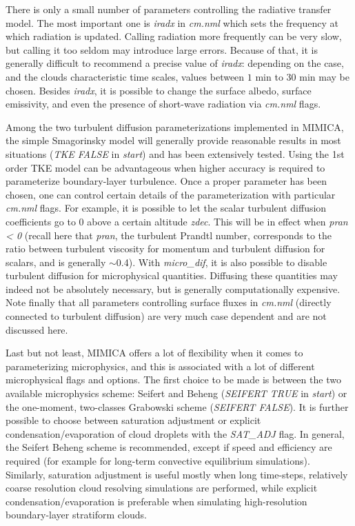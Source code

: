 \documentclass[12pt,A4,french]{article}
\begin{document}
There is only a small number of parameters controlling the radiative transfer model. The most important one is {\it iradx} in {\it cm.nml} which sets the frequency at which radiation is updated. Calling radiation more frequently can be very slow, but calling it too seldom may introduce large errors. Because of that, it is generally difficult to recommend a precise value of {\it iradx}: depending on the case, and the clouds characteristic time scales, values between $1$ min to $30$ min may be chosen. Besides {\it iradx}, it is possible to change the surface albedo, surface emissivity, and even the presence of short-wave radiation via {\it cm.nml} flags.

Among the two turbulent diffusion parameterizations implemented in MIMICA, the simple Smagorinsky model will generally provide reasonable results in most situations ({\it TKE FALSE} in {\it start}) and has been extensively tested. Using the 1st order TKE model can be advantageous when higher accuracy is required to parameterize boundary-layer turbulence. Once a proper parameter has been chosen, one can control certain details of the parameterization with particular {\it cm.nml} flags. For example, it is possible to let the scalar turbulent diffusion coefficients go to 0 above a certain altitude {\it zdec}. This will be in effect when {\it pran < 0} (recall here that {\it pran}, the turbulent Prandtl number, corresponds to the ratio between turbulent viscosity for momentum and turbulent diffusion for scalars, and is generally $\sim$0.4). With {\it micro\_dif}, it is also possible to disable turbulent diffusion for microphysical quantities. Diffusing these quantities may indeed not be absolutely necessary, but is generally computationally expensive. Note finally that all parameters controlling surface fluxes in {\it cm.nml} (directly connected to turbulent diffusion) are very much case dependent and are not discussed here.

Last but not least, MIMICA offers a lot of flexibility when it comes to parameterizing microphysics, and this is associated with a lot of different microphysical flags and options. The first choice to be made is between the two available microphysics scheme: Seifert and Beheng ({\it SEIFERT TRUE} in {\it start}) or the one-moment, two-classes Grabowski scheme ({\it SEIFERT FALSE}). It is further possible to choose between saturation adjustment or explicit condensation/evaporation of cloud droplets with the {\it SAT\_ADJ} flag. In general, the Seifert Beheng scheme is recommended, except if speed and efficiency are required (for example for long-term convective equilibrium simulations). Similarly, saturation adjustment is useful mostly when long time-steps, relatively coarse resolution cloud resolving simulations are performed, while explicit condensation/evaporation is preferable when simulating high-resolution boundary-layer stratiform clouds.
\end{document}

